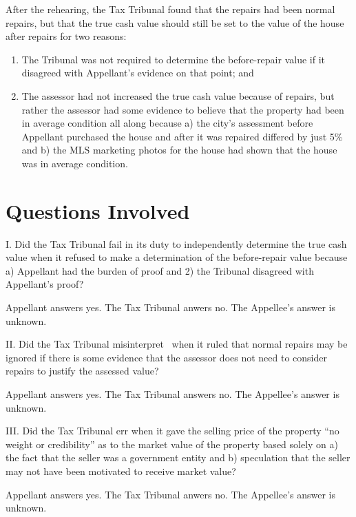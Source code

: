 \documentclass[12pt,\documentclassflag]{michiganCourtOfAppealsBrief}
\begin{document}
After the rehearing, the Tax Tribunal found that the repairs had been normal repairs, but that the true cash value should still be set to the value of the house after repairs for two reasons:

\begin{enumerate}
\item The Tribunal was not required to determine the before-repair value if it disagreed with Appellant's evidence on that point; and
\item The assessor had not increased the true cash value because of repairs, but rather the assessor had some evidence to believe that the property had been in average condition all along because a) the city's assessment before Appellant purchased the house and after it was repaired differed by just 5\% and b) the MLS marketing photos for the house had shown that the house was in average condition. 
\end{enumerate}


\newpage 
\section{Questions Involved}

\noindent I. Did the Tax Tribunal fail in its duty to independently determine the true cash value when it refused to make a determination of the before-repair value because a) Appellant had the burden of proof and 2) the Tribunal disagreed with Appellant's proof?

Appellant answers yes. The Tax Tribunal anwers no. The Appellee's answer is unknown. 
\vspace{\baselineskip}

\noindent II. Did the Tax Tribunal misinterpret \mathieuGast\ when it ruled that normal repairs may be ignored if there is some evidence that the assessor does not need to consider repairs to justify the assessed value?

Appellant answers yes. The Tax Tribunal answers no. The Appellee's answer is unknown.

\vspace{\baselineskip}

\noindent III. Did the Tax Tribunal err when it gave the selling price of the property ``no weight or credibility'' as to the market value of the property based solely on a) the fact that the seller was a government entity and b) speculation that the seller may not have been motivated to receive market value?

Appellant answers yes. The Tax Tribunal anwers no. The Appellee's answer is unknown. 
\end{document}
